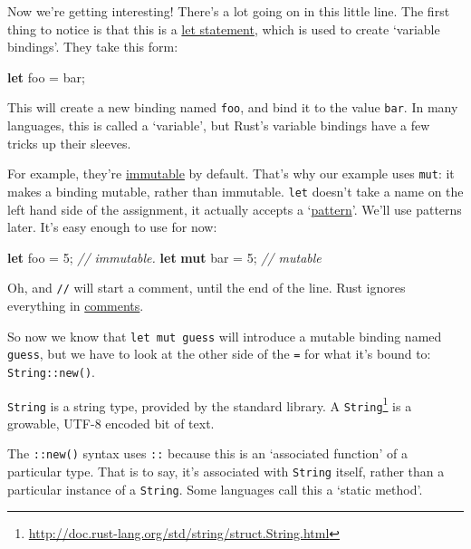 \documentclass[a4paper,]{book}
\newenvironment{Shaded}{\begin{snugshade}}{\end{snugshade}}
\newcommand{\KeywordTok}[1]{\textcolor[rgb]{0.13,0.29,0.53}{\textbf{{#1}}}}
\newcommand{\DecValTok}[1]{\textcolor[rgb]{0.00,0.00,0.81}{{#1}}}
\newcommand{\CommentTok}[1]{\textcolor[rgb]{0.56,0.35,0.01}{\textit{{#1}}}}
\newcommand{\NormalTok}[1]{{#1}}
\renewcommand{\href}[2]{#2\footnote{\url{#1}}}
\begin{document}
Now we're getting interesting! There's a lot going on in this little
line. The first thing to notice is that this is a
\protect\hyperlink{sec--variable-bindings}{let statement}, which is used
to create `variable bindings'. They take this form:

\begin{Shaded}
\begin{Highlighting}[]
\KeywordTok{let} \NormalTok{foo = bar;}
\end{Highlighting}
\end{Shaded}

This will create a new binding named \texttt{foo}, and bind it to the
value \texttt{bar}. In many languages, this is called a `variable', but
Rust's variable bindings have a few tricks up their sleeves.

For example, they're \protect\hyperlink{sec--mutability}{immutable} by
default. That's why our example uses \texttt{mut}: it makes a binding
mutable, rather than immutable. \texttt{let} doesn't take a name on the
left hand side of the assignment, it actually accepts a
`\protect\hyperlink{sec--patterns}{pattern}'. We'll use patterns later.
It's easy enough to use for now:

\begin{Shaded}
\begin{Highlighting}[]
\KeywordTok{let} \NormalTok{foo = }\DecValTok{5}\NormalTok{; }\CommentTok{// immutable.}
\KeywordTok{let} \KeywordTok{mut} \NormalTok{bar = }\DecValTok{5}\NormalTok{; }\CommentTok{// mutable}
\end{Highlighting}
\end{Shaded}

Oh, and \texttt{//} will start a comment, until the end of the line.
Rust ignores everything in \protect\hyperlink{sec--comments}{comments}.

So now we know that \texttt{let\ mut\ guess} will introduce a mutable
binding named \texttt{guess}, but we have to look at the other side of
the \texttt{=} for what it's bound to: \texttt{String::new()}.

\texttt{String} is a string type, provided by the standard library. A
\href{http://doc.rust-lang.org/std/string/struct.String.html}{\texttt{String}}
is a growable, UTF-8 encoded bit of text.

The \texttt{::new()} syntax uses \texttt{::} because this is an
`associated function' of a particular type. That is to say, it's
associated with \texttt{String} itself, rather than a particular
instance of a \texttt{String}. Some languages call this a `static
method'.
\end{document}
